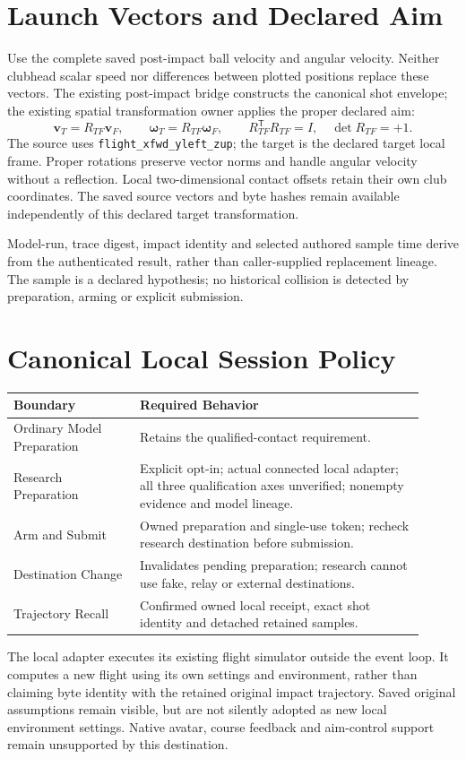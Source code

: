 \documentclass[11pt]{article}
\newcommand{\code}[1]{\nolinkurl{#1}}
\begin{document}
\newpage
\section*{Launch Vectors and Declared Aim}
Use the complete saved post-impact ball velocity and angular velocity. Neither
clubhead scalar speed nor differences between plotted positions replace these
vectors. The existing post-impact bridge constructs the canonical shot envelope;
the existing spatial transformation owner applies the proper declared aim:
\[
\mathbf v_T=R_{TF}\mathbf v_F,\qquad
\boldsymbol\omega_T=R_{TF}\boldsymbol\omega_F,\qquad
R_{TF}^{\mathsf T}R_{TF}=I,\quad\det R_{TF}=+1.
\]
The source uses \code{flight_xfwd_yleft_zup}; the target is the declared target
local frame. Proper rotations preserve vector norms and handle angular velocity
without a reflection. Local two-dimensional contact offsets retain their own
club coordinates. The saved source vectors and byte hashes remain available
independently of this declared target transformation.

Model-run, trace digest, impact identity and selected authored sample time derive
from the authenticated result, rather than caller-supplied replacement lineage.
The sample is a declared hypothesis; no historical collision is detected by
preparation, arming or explicit submission.

\section*{Canonical Local Session Policy}
\begin{center}\small
\begin{tabular}{>{\raggedright\arraybackslash}p{0.28\linewidth}>{\raggedright\arraybackslash}p{0.63\linewidth}}\toprule
Boundary & Required Behavior\\\midrule
Ordinary Model Preparation & Retains the qualified-contact requirement.\\
Research Preparation & Explicit opt-in; actual connected local adapter; all three qualification axes unverified; nonempty evidence and model lineage.\\
Arm and Submit & Owned preparation and single-use token; recheck research destination before submission.\\
Destination Change & Invalidates pending preparation; research cannot use fake, relay or external destinations.\\
Trajectory Recall & Confirmed owned local receipt, exact shot identity and detached retained samples.\\\bottomrule
\end{tabular}
\end{center}
The local adapter executes its existing flight simulator outside the event loop.
It computes a new flight using its own settings and environment, rather than
claiming byte identity with the retained original impact trajectory. Saved
original assumptions remain visible, but are not silently adopted as new local
environment settings. Native avatar, course feedback and aim-control support
remain unsupported by this destination.
\end{document}
